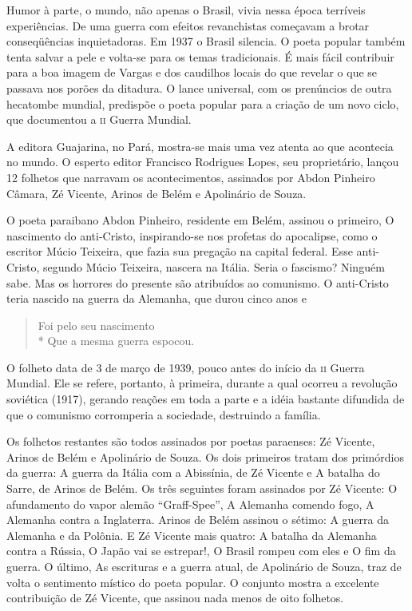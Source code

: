 Humor à parte, o mundo, não apenas o Brasil, vivia nessa época
terríveis experiências. De uma guerra com efeitos revanchistas
começavam a brotar conseqüências inquietadoras. Em 1937 o Brasil
silencia. O poeta popular também tenta salvar a pele e volta-se para
os temas tradicionais. É mais fácil contribuir para a boa imagem de
Vargas e dos caudilhos locais do que revelar o que se passava nos
porões da ditadura. O lance universal, com os prenúncios de outra
hecatombe mundial, predispõe o poeta popular para a criação de um
novo ciclo, que documentou a \textsc{ii} Guerra Mundial.

A editora Guajarina, no Pará, mostra-se mais uma vez atenta ao que
acontecia no mundo. O esperto editor Francisco Rodrigues Lopes, seu
proprietário, lançou 12 folhetos que narravam os acontecimentos,
assinados por Abdon Pinheiro Câmara, Zé Vicente, Arinos de Belém e
Apolinário de Souza.

O poeta paraibano Abdon Pinheiro, residente em Belém, assinou o
primeiro, O nascimento do anti-Cristo, inspirando-se nos profetas do
apocalipse, como o escritor Múcio Teixeira, que fazia sua pregação na
capital federal. Esse anti-Cristo, segundo Múcio Teixeira, nascera na
Itália. Seria o fascismo? Ninguém sabe. Mas os horrores do presente
são atribuídos ao comunismo. O anti-Cristo teria nascido na guerra da
Alemanha, que durou cinco anos e

\begin{verse}
Foi pelo seu nascimento\\*
Que a mesma guerra espocou.
\end{verse}

O folheto data de 3 de março de 1939, pouco antes do início da \textsc{ii}
Guerra Mundial. Ele se refere, portanto, à primeira, durante a qual
ocorreu a revolução soviética (1917), gerando reações em toda a parte
e a idéia bastante difundida de que o comunismo corromperia a
sociedade, destruindo a família. 

Os folhetos restantes são todos assinados por poetas paraenses: Zé
Vicente, Arinos de Belém e Apolinário de Souza. Os dois primeiros
tratam dos primórdios da guerra: A guerra da Itália com a Abissínia,
de Zé Vicente e A batalha do Sarre, de Arinos de Belém. Os três
seguintes foram assinados por Zé Vicente: O afundamento do vapor
alemão “Graff-Spee”, A Alemanha comendo fogo, A Alemanha contra a
Inglaterra. Arinos de Belém assinou o sétimo: A guerra da Alemanha e
da Polônia. E Zé Vicente mais quatro: A batalha da Alemanha contra a
Rússia, O Japão vai se estrepar!, O Brasil rompeu com eles e O fim da
guerra. O último, As escrituras e a guerra atual, de Apolinário de
Souza, traz de volta o sentimento místico do poeta popular. O
conjunto mostra a excelente contribuição de Zé Vicente, que assinou
nada menos de oito folhetos.

